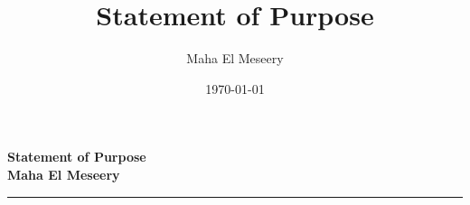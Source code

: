 \documentclass[10pt]{article}%
\title{Statement of Purpose}
\author{Maha El Meseery }
\date{\today}
\begin{document}
\large
 \begin{center}
\textbf{ Statement of Purpose \\ Maha El Meseery } \hrule
\end{center}
\normalsize


%
%
%
%
%
%
%
%
%
\end{document}
